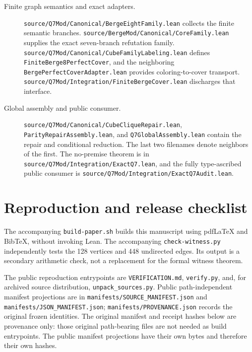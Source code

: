 \documentclass[11pt]{article}
\theoremstyle{definition}\newtheorem{definition}[theorem]{Definition}
\theoremstyle{remark}\newtheorem{remark}[theorem]{Remark}
\newcommand{\src}[1]{{\small\nolinkurl{#1}}}
\begin{document}
\begin{description}
\item[Finite graph semantics and exact adapters.]
\src{source/Q7Mod/Canonical/BergeEightFamily.lean} collects the finite semantic branches.
\src{source/BergeMod/Canonical/CoreFamily.lean} supplies the exact seven-branch refutation family.
\src{source/Q7Mod/Canonical/CubeFamilyLabeling.lean} defines \src{FiniteBerge8PerfectCover}, and the neighboring \src{BergePerfectCoverAdapter.lean} provides coloring-to-cover transport.
\src{source/Q7Mod/Integration/FiniteBergeCover.lean} discharges that interface.

\item[Global assembly and public consumer.]
\src{source/Q7Mod/Canonical/CubeCliqueRepair.lean}, \src{ParityRepairAssembly.lean}, and \src{Q7GlobalAssembly.lean} contain the repair and conditional reduction. The last two filenames denote neighbors of the first.
The no-premise theorem is in \src{source/Q7Mod/Integration/ExactQ7.lean}, and the fully type-ascribed public consumer is \src{source/Q7Mod/Integration/ExactQ7Audit.lean}.
\end{description}

\section{Reproduction and release checklist}\label{app:reproduce}
The accompanying \src{build-paper.sh} builds this manuscript using pdfLaTeX and BibTeX, without invoking Lean. The accompanying \src{check-witness.py} independently tests the 128 vertices and 448 undirected edges. Its output is a secondary arithmetic check, not a replacement for the formal witness theorem.

The public reproduction entrypoints are \src{VERIFICATION.md}, \src{verify.py}, and, for archived source distribution, \src{unpack_sources.py}. Public path-independent manifest projections are in \src{manifests/SOURCE_MANIFEST.json} and \src{manifests/JSON_MANIFEST.json}; \src{manifests/PROVENANCE.json} records the original frozen identities. The original manifest and receipt hashes below are provenance only: those original path-bearing files are not needed as build entrypoints. The public manifest projections have their own bytes and therefore their own hashes.
\end{document}
